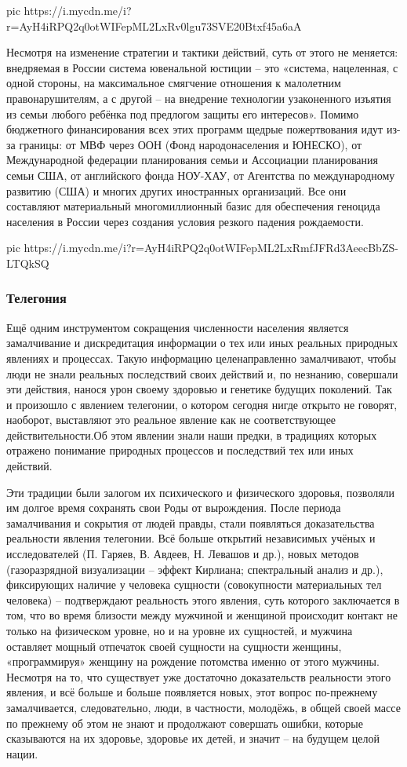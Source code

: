 \ifcmt
pic https://i.mycdn.me/i?r=AyH4iRPQ2q0otWIFepML2LxRv0lgu73SVE20Btxf45a6aA
\fi

Несмотря на изменение стратегии и тактики действий, суть от этого не меняется:
внедряемая в России система ювенальной юстиции – это «система, нацеленная, с
одной стороны, на максимальное смягчение отношения к малолетним
правонарушителям, а с другой – на внедрение технологии узаконенного изъятия из
семьи любого ребёнка под предлогом защиты его интересов». Помимо бюджетного
финансирования всех этих программ щедрые пожертвования идут из-за границы: от
МВФ через ООН (Фонд народонаселения и ЮНЕСКО), от Международной федерации
планирования семьи и Ассоциации планирования семьи США, от английского фонда
НОУ-ХАУ, от Агентства по международному развитию (США) и многих других
иностранных организаций. Все они составляют материальный многомиллионный базис
для обеспечения геноцида населения в России через создания условия резкого
падения рождаемости. 

\ifcmt
pic https://i.mycdn.me/i?r=AyH4iRPQ2q0otWIFepML2LxRmfJFRd3AeecBbZS-LTQkSQ
\fi

\subsubsection{Телегония }

Ещё одним инструментом сокращения численности населения является замалчивание и
дискредитация информации о тех или иных реальных природных явлениях и
процессах. Такую информацию целенаправленно замалчивают, чтобы люди не знали
реальных последствий своих действий и, по незнанию, совершали эти действия,
нанося урон своему здоровью и генетике будущих поколений. Так и произошло с
явлением телегонии, о котором сегодня нигде открыто не говорят, наоборот,
выставляют это реальное явление как не соответствующее действительности.Об этом
явлении знали наши предки, в традициях которых отражено понимание природных
процессов и последствий тех или иных действий. 

Эти традиции были залогом их психического и физического здоровья, позволяли им
долгое время сохранять свои Роды от вырождения. После периода замалчивания и
сокрытия от людей правды, стали появляться доказательства реальности явления
телегонии. Всё больше открытий независимых учёных и исследователей (П. Гаряев,
В. Авдеев, Н. Левашов и др.), новых методов (газоразрядной визуализации –
эффект Кирлиана; спектральный анализ и др.), фиксирующих наличие у человека
сущности (совокупности материальных тел человека) – подтверждают реальность
этого явления, суть которого заключается в том, что во время близости между
мужчиной и женщиной происходит контакт не только на физическом уровне, но и на
уровне их сущностей, и мужчина оставляет мощный отпечаток своей сущности на
сущности женщины, «программируя» женщину на рождение потомства именно от этого
мужчины. Несмотря на то, что существует уже достаточно доказательств реальности
этого явления, и всё больше и больше появляется новых, этот вопрос по-прежнему
замалчивается, следовательно, люди, в частности, молодёжь, в общей своей массе
по прежнему об этом не знают и продолжают совершать ошибки, которые сказываются
на их здоровье, здоровье их детей, и значит – на будущем целой нации.

